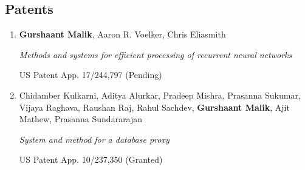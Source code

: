 \subsection{Patents}
\begin{enumerate}
	\setcounter{enumi}{\value{publicationCounter}}
	
	\item \textbf{Gurshaant Malik}, Aaron R. Voelker, Chris Eliasmith
	
	\textit{Methods and systems for efficient processing of recurrent neural networks}
	
	US Patent App. 17/244,797 (Pending)
	
	\item Chidamber Kulkarni, Aditya Alurkar, Pradeep Mishra, Prasanna Sukumar, Vijaya Raghava, Raushan Raj, Rahul Sachdev, \textbf{Gurshaant Malik}, Ajit Mathew, Prasanna Sundararajan
	
	\textit{System and method for a database proxy}
	
	US Patent App. 10/237,350 (Granted)
	
	\setcounter{publicationCounter}{\value{enumi}}	%
\end{enumerate}

